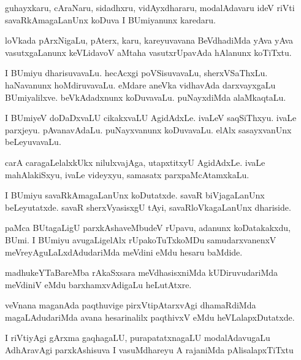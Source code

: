 \documentclass{article}
\begin{document}
\begin{mn}
guhayxkaru, cAraNaru, sidadhxru, vidAyxdhararu, modalAdavaru ideV riVti 
savaRkAmagaLanUnx koDuva I BUmiyanunx karedaru. 
\end{mn}

\begin{mn}
loVkada pArxNigaLu, pAterx, karu, kareyuvavana BeVdhadiMda yAva yAva 
vasutxgaLanunx keVLidavoV aMtaha vasutxrUpavAda  hAlanunx koTiTxtu.
\end{mn}

\begin{mn}
I BUmiyu dharisuvavaLu.  hecAcxgi poVSisuvavaLu, sherxVSaThxLu. haNavanunx 
hoMdiruvavaLu.  eMdare aneVka vidhavAda darxvayxgaLu BUmiyalilxve.  
beVkAdadxnunx koDuvavaLu.  puNayxdiMda alaMkaqtaLu. 
\end{mn}

\begin{mn}
I BUmiyeV doDaDxvaLU cikakxvaLU AgidAdxLe.  ivaLeV saqSiThxyu.  ivaLe parxjeyu.  
pAvanavAdaLu.  puNayxvanunx koDuvavaLu.  elAlx sasayxvanUnx beLeyuvavaLu.
\end{mn}

\begin{mn}
carA caragaLelalxkUkx  nilulxvajAga,  utapxtitxyU  AgidAdxLe. ivaLe mahAlakiSxyu, 
ivaLe videyxyu, samasatx parxpaMcAtamxkaLu. 
\end{mn}

\begin{mn}
I BUmiyu  savaRkAmagaLanUnx  koDutatxde.  savaR biVjagaLanUnx beLeyutatxde.  
savaR sherxVyasisxgU tAyi,  savaRloVkagaLanUnx dhariside.
\end{mn}

\begin{mn}
paMca BUtagaLigU parxkAshaveMbudeV rUpavu,  adanunx koDatakakxdu,  BUmi.  
I  BUmiyu  avugaLigelAlx  rUpakoTuTxkoMDu samudarxvanenxV  
meVreyAguLaLxdAdudariMda meVdini  eMdu hesaru baMdide.
\end{mn}

\begin{mn}
madhukeYTaBareMba  rAkaSxsara meVdhasisxniMda  kUDiruvudariMda meVdiniV 
eMdu barxhamxvAdigaLu heLutAtxre.
\end{mn}

\begin{mn}
veVnana  maganAda  paqthuvige  pirxVtipAtarxvAgi dhamaRdiMda magaLAdudariMda 
avana hesarinalilx paqthivxV eMdu heVLalapxDutatxde.
\end{mn}

\begin{mn}
I riVtiyAgi gArxma gaqhagaLU,  purapatatxnagaLU  modalAdavugaLu 
AdhAravAgi parxkAshisuva I vasuMdhareyu A rajaniMda pAlisalapxTiTxtu
\end{mn}
\end{document}
